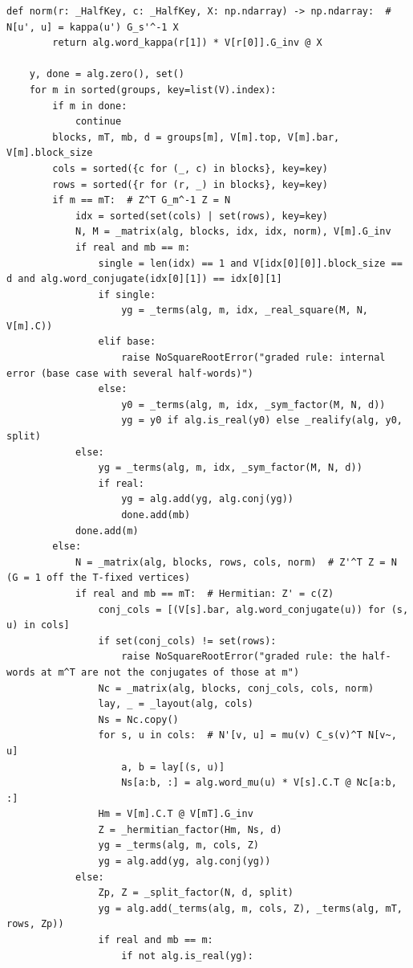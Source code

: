 \documentclass[12pt, a4paper]{report}
\theoremstyle{plain}
\theoremstyle{definition}
\theoremstyle{remark}
\theoremstyle{plain}
\begin{document}
\begin{lstlisting}[style=dsqcode]
    def norm(r: _HalfKey, c: _HalfKey, X: np.ndarray) -> np.ndarray:  # N[u', u] = kappa(u') G_s'^-1 X
        return alg.word_kappa(r[1]) * V[r[0]].G_inv @ X

    y, done = alg.zero(), set()
    for m in sorted(groups, key=list(V).index):
        if m in done:
            continue
        blocks, mT, mb, d = groups[m], V[m].top, V[m].bar, V[m].block_size
        cols = sorted({c for (_, c) in blocks}, key=key)
        rows = sorted({r for (r, _) in blocks}, key=key)
        if m == mT:  # Z^T G_m^-1 Z = N
            idx = sorted(set(cols) | set(rows), key=key)
            N, M = _matrix(alg, blocks, idx, idx, norm), V[m].G_inv
            if real and mb == m:
                single = len(idx) == 1 and V[idx[0][0]].block_size == d and alg.word_conjugate(idx[0][1]) == idx[0][1]
                if single:
                    yg = _terms(alg, m, idx, _real_square(M, N, V[m].C))
                elif base:
                    raise NoSquareRootError("graded rule: internal error (base case with several half-words)")
                else:
                    y0 = _terms(alg, m, idx, _sym_factor(M, N, d))
                    yg = y0 if alg.is_real(y0) else _realify(alg, y0, split)
            else:
                yg = _terms(alg, m, idx, _sym_factor(M, N, d))
                if real:
                    yg = alg.add(yg, alg.conj(yg))
                    done.add(mb)
            done.add(m)
        else:
            N = _matrix(alg, blocks, rows, cols, norm)  # Z'^T Z = N  (G = 1 off the T-fixed vertices)
            if real and mb == mT:  # Hermitian: Z' = c(Z)
                conj_cols = [(V[s].bar, alg.word_conjugate(u)) for (s, u) in cols]
                if set(conj_cols) != set(rows):
                    raise NoSquareRootError("graded rule: the half-words at m^T are not the conjugates of those at m")
                Nc = _matrix(alg, blocks, conj_cols, cols, norm)
                lay, _ = _layout(alg, cols)
                Ns = Nc.copy()
                for s, u in cols:  # N'[v, u] = mu(v) C_s(v)^T N[v~, u]
                    a, b = lay[(s, u)]
                    Ns[a:b, :] = alg.word_mu(u) * V[s].C.T @ Nc[a:b, :]
                Hm = V[m].C.T @ V[mT].G_inv
                Z = _hermitian_factor(Hm, Ns, d)
                yg = _terms(alg, m, cols, Z)
                yg = alg.add(yg, alg.conj(yg))
            else:
                Zp, Z = _split_factor(N, d, split)
                yg = alg.add(_terms(alg, m, cols, Z), _terms(alg, mT, rows, Zp))
                if real and mb == m:
                    if not alg.is_real(yg):

\end{lstlisting}
\end{document}
